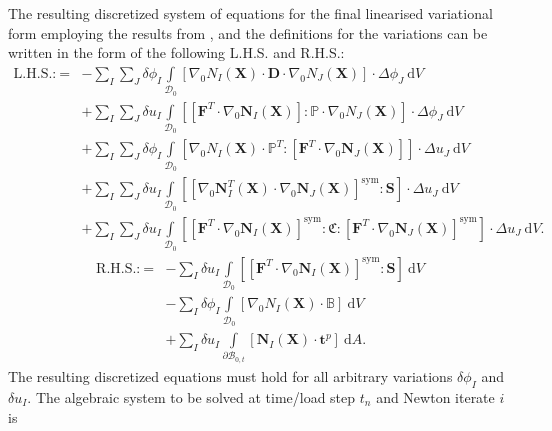 The resulting discretized system of equations for the final linearised variational form  employing the results from ,  and the definitions for the variations  can be written in the form of the following L.H.S. and R.H.S.:
\begin{align}
\text{L.H.S.:} \ = &- \sum\limits_I \sum\limits_J \delta \phi_I \int\limits_{\mathcal{D}_0} \left[ \nabla_0 N_I (\mathbf{X}) \cdot \mathbf{D} \cdot \nabla_0 N_J (\mathbf{X}) \right] \cdot \Delta \phi_J \ \mathrm{d}V \nonumber \\
&+ \sum\limits_I \sum\limits_J \delta u_I \int\limits_{\mathcal{D}_0} \left[ \left[ \mathbf{F}^T \cdot \nabla_0 \mathbf{N}_I (\mathbf{X}) \right] : \mathbb{P} \cdot \nabla_0 N_J (\mathbf{X}) \right] \cdot \Delta \phi_J \ \mathrm{d}V \nonumber \\
&+ \sum\limits_I \sum\limits_J \delta \phi_I \int\limits_{\mathcal{D}_0} \left[ \nabla_0 N_I (\mathbf{X}) \cdot \mathbb{P}^T : \left[ \mathbf{F}^T \cdot \nabla_0 \mathbf{N}_J (\mathbf{X}) \right] \right] \cdot \Delta u_J \ \mathrm{d}V \nonumber \\
&+ \sum\limits_I \sum\limits_J \delta u_I \int\limits_{\mathcal{D}_0} \left[ \left[ \nabla_0 \mathbf{N}_I^T (\mathbf{X}) \cdot \nabla_0 \mathbf{N}_J (\mathbf{X}) \right]^{\text{sym}} : \mathbf{S} \right] \cdot \Delta u_J \ \mathrm{d}V \nonumber \\
&+ \sum\limits_I \sum\limits_J \delta u_I \int\limits_{\mathcal{D}_0} \left[ \left[ \mathbf{F}^T \cdot \nabla_0 \mathbf{N}_I (\mathbf{X}) \right]^{\text{sym}} : \mathfrak{C} : \left[ \mathbf{F}^T \cdot \nabla_0 \mathbf{N}_J (\mathbf{X}) \right]^{\text{sym}} \right] \cdot \Delta u_J \ \mathrm{d}V.
\label{eq:3.36}
\end{align}
\begin{align}
\text{R.H.S.:} \ = &- \sum\limits_I \delta u_I \int\limits_{\mathcal{D}_0} \left[ \left[ \mathbf{F}^T \cdot \nabla_0 \mathbf{N}_I (\mathbf{X}) \right]^{\text{sym}} : \mathbf{S} \right] \ \mathrm{d}V \nonumber \\
&- \sum\limits_I \delta \phi_I \int\limits_{\mathcal{D}_0} \left[ \nabla_0 N_I (\mathbf{X}) \cdot \mathbb{B} \right] \ \mathrm{d}V \nonumber \\
&+ \sum\limits_I \delta u_I \int\limits_{\partial \mathcal{B}_{0,t}} \left[ \mathbf{N}_I (\mathbf{X}) \cdot \mathbf{t}^p \right] \ \mathrm{d}A.
\label{eq:3.37}
\end{align}
The resulting discretized equations  must hold for all arbitrary variations $\delta \phi_I$ and $\delta u_I$. The algebraic system to be solved at time/load step $t_n$ and Newton iterate $i$ is
